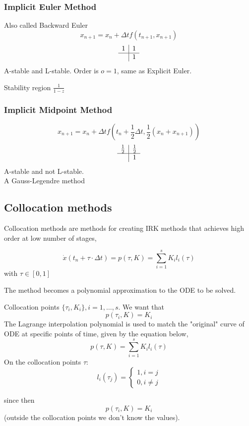 \subsubsection{Implicit Euler Method}
Also called Backward Euler
$$
x_{n+1}=x_n+\Delta tf(t_{n+1}, x_{n+1})
$$
$$
\begin{array}{c|c}
1 & 1 \\\hline &1
\end{array}
$$
A-stable and L-stable. Order is $o=1$, same as Explicit Euler. 
 
Stability region $\frac{1}{1-z}$

\subsubsection{Implicit Midpoint Method}
$$
x_{n+1}=x_n+\Delta tf(t_n+  \frac{1}{2}\Delta t, \frac{1}{2}(x_n+x_{n+1}))
$$
$$
\begin{array}{c|c}
\frac{1}{2} & \frac{1}{2} \\\hline &1
\end{array}
$$
A-stable and not L-stable.\\
A Gauss-Legendre method

\subsection{Collocation methods}
Collocation methods are methods for creating IRK methods that achieves high order at low number of stages,

$$
\dot x(t_n+\tau\cdot\Delta t)=p(\tau,K)=\sum_{i=1}^sK_il_i(\tau)
$$
with $\tau\in[0,1]$

The method becomes a polynomial approximation to the ODE to be solved.

Collocation points $\{\tau_i,K_i\}, i=1,\dots,s$. We want that
$$
p(\tau_i,K)=K_i
$$
The Lagrange interpolation polynomial is used to match the "original" curve of ODE at specific points of time, given by the equation below,
$$
p(\tau, K) =\sum_{i=1}^sK_il_i(\tau)
$$
On the collocation points $\tau$:
\begin{equation*}
l_i(\tau_j)=\left\{\begin{split}
1,i=j\\0,i\ne j
\end{split}\right.
\end{equation*}

since then
$$
p(\tau_i,K)=K_i
$$
(outside the collocation points we don't know the values).

